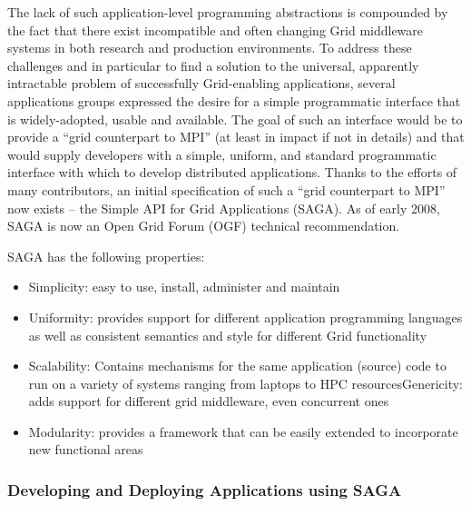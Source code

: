 \documentclass[a4paper,10pt]{article}
\begin{document}

The lack of such application-level programming abstractions is compounded by the fact that there exist incompatible and often changing Grid middleware systems in both research and production environments.  To address these challenges and in particular to find a solution to the universal, apparently intractable problem of successfully Grid-enabling applications, several applications groups expressed the desire for a simple programmatic interface that is widely-adopted, usable and available.  The goal of such an interface would be to provide a ``grid counterpart to MPI'' (at least in impact if not in details) and that would supply developers with a simple, uniform, and standard programmatic interface with which to develop distributed applications.  Thanks to the efforts of many contributors, an initial specification of such a ``grid counterpart to MPI'' now exists -- the Simple API for Grid Applications (SAGA). As of early 2008, SAGA is now an Open Grid Forum (OGF) technical recommendation.

SAGA has the following properties:

\begin{itemize}
\item Simplicity: easy to use, install, administer and maintain
\item Uniformity: provides support for different application programming languages as well as consistent 
semantics and style for different Grid functionality
\item Scalability: Contains mechanisms for the same application (source) code to run on a variety of 
systems ranging from laptops to HPC resourcesGenericity: adds support for different grid middleware, 
even concurrent ones
\item Modularity: provides a framework that can be easily extended to incorporate new functional areas
\end{itemize}


\subsubsection*{Developing and Deploying Applications using SAGA}
\end{document}
